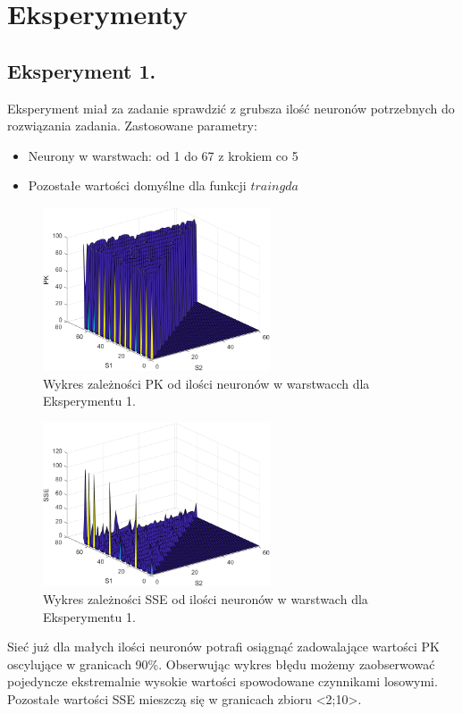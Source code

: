 \documentclass[a4paper, openright, twoside,11pt]{article}
\begin{document}
    
\clearpage
\section{Eksperymenty}
\subsection{Eksperyment 1.}
    Eksperyment miał za zadanie sprawdzić z grubsza ilość neuronów potrzebnych do rozwiązania zadania. Zastosowane parametry:
    
    \begin{itemize}
        \item Neurony w warstwach: od 1 do 67 z krokiem co 5
        \item Pozostałe wartości domyślne dla funkcji $traingda$
       \end{itemize}
       
        \begin{figure}[!h]
            \centering
            \includegraphics[width = 0.6\textwidth]{Grafika/eksperymenty/pk1.png}
            \caption {Wykres zależności PK od ilości neuronów w warstwacch dla Eksperymentu 1.}
            \label{fig:PKeksperyment1}
        \end{figure}
        \begin{figure}[!h]
            \centering
            \includegraphics[width = 0.6\textwidth]{Grafika/eksperymenty/sse1.png}
            \caption {Wykres zależności SSE od ilości neuronów w warstwach dla Eksperymentu 1.}
            \label{fig:PKeksperyment1}
        \end{figure}
    Sieć już dla małych ilości neuronów potrafi osiągnąć zadowalające wartości PK oscylujące w granicach 90\%. Obserwując wykres błędu możemy zaobserwować pojedyncze ekstremalnie wysokie wartości spowodowane czynnikami losowymi. Pozostałe wartości SSE mieszczą się w granicach zbioru <2;10>.
    \clearpage
\end{document}
